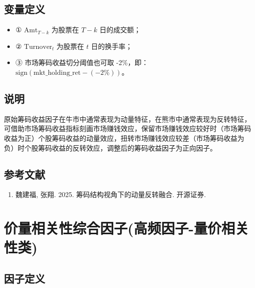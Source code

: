 \documentclass{article}
\begin{document}
\subsection{变量定义}
\begin{itemize}
    \item ① \( \mathrm{Amt}_{T-k} \) 为股票在 \( T-k \) 日的成交额；
    \item ② \( \mathrm{Turnover}_t \) 为股票在 \( t \) 日的换手率；
    \item ③ 市场筹码收益切分阈值也可取 -2\%，即：\( \mathrm{sign}(\mathrm{mkt\_holding\_ret} - (-2\%)) \)。
\end{itemize}

\subsection{说明}
原始筹码收益因子在牛市中通常表现为动量特征，在熊市中通常表现为反转特征，可借助市场筹码收益指标刻画市场赚钱效应，保留市场赚钱效应较好时（市场筹码收益为正）个股筹码收益的动量效应，扭转市场赚钱效应较差（市场筹码收益为负）时个股筹码收益的反转效应，调整后的筹码收益因子为正向因子。

\subsection{参考文献}
\begin{enumerate}
    \item 魏建福, 张翔. 2025. 筹码结构视角下的动量反转融合. 开源证券.
\end{enumerate}

\section{价量相关性综合因子(高频因子-量价相关性类)}

\subsection{因子定义}
\end{document}
